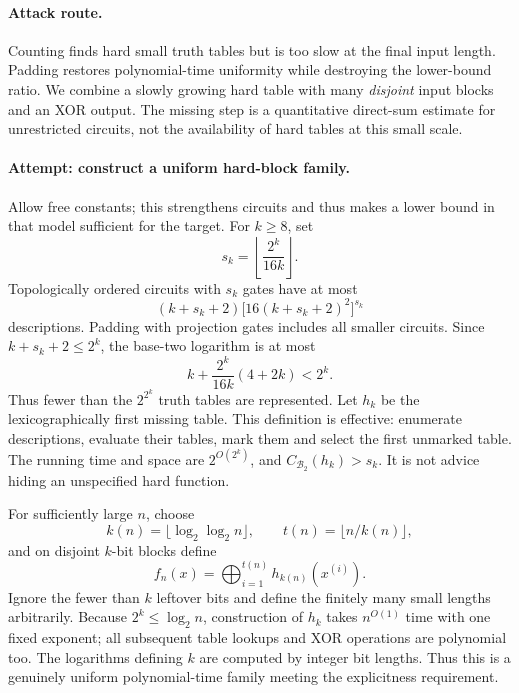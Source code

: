 \documentclass[11pt,a4paper]{article}
\numberwithin{equation}{section}
\begin{document}
\paragraph{Attack route.}
Counting finds hard small truth tables but is too slow at the final input
length. Padding restores polynomial-time uniformity while destroying the
lower-bound ratio. We combine a slowly growing hard table with many
\emph{disjoint} input blocks and an XOR output. The missing step is a
quantitative direct-sum estimate for unrestricted circuits, not the
availability of hard tables at this small scale.

\paragraph{Attempt: construct a uniform hard-block family.}
Allow free constants; this strengthens circuits and thus makes a lower bound
in that model sufficient for the target. For $k\ge8$, set
\[
 s_k=\left\lfloor\frac{2^k}{16k}\right\rfloor.
\]
Topologically ordered circuits with $s_k$ gates have at most
\begin{equation}\label{30006747:count}
 (k+s_k+2)\bigl[16(k+s_k+2)^2\bigr]^{s_k}
\end{equation}
descriptions. Padding with projection gates includes all smaller circuits.
Since $k+s_k+2\le2^k$, the base-two logarithm is at most
\[
 k+\frac{2^k}{16k}(4+2k)<2^k.
\]
Thus fewer than the $2^{2^k}$ truth tables are represented. Let $h_k$ be
the lexicographically first missing table. This definition is effective:
enumerate descriptions, evaluate their tables, mark them and select the
first unmarked table. The running time and space are $2^{O(2^k)}$, and
$C_{\mathcal B_2}(h_k)>s_k$. It is not advice hiding an unspecified hard
function.

For sufficiently large $n$, choose
\[
 k(n)=\lfloor\log_2\log_2n\rfloor,
 \qquad t(n)=\lfloor n/k(n)\rfloor,
\]
and on disjoint $k$-bit blocks define
\begin{equation}\label{30006747:family}
 f_n(x)=\bigoplus_{i=1}^{t(n)}h_{k(n)}(x^{(i)}).
\end{equation}
Ignore the fewer than $k$ leftover bits and define the finitely many small
lengths arbitrarily. Because $2^k\le\log_2n$, construction of $h_k$ takes
$n^{O(1)}$ time with one fixed exponent; all subsequent table lookups and
XOR operations are polynomial too. The logarithms defining $k$ are computed
by integer bit lengths. Thus this is a genuinely uniform polynomial-time
family meeting the explicitness requirement.
\end{document}
